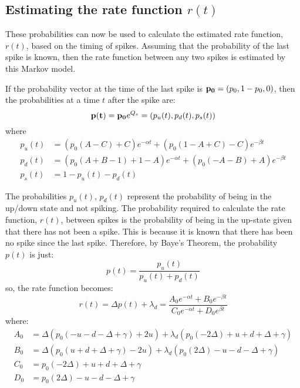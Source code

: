 \documentclass[11pt]{paper}
\begin{document}
\subsection{Estimating the rate function $r(t)$}

These probabilities can now be used to calculate the estimated rate function, $r(t)$, based on the timing of spikes.  Assuming that the probability of the last spike is known, then the rate function between any two spikes is estimated by this Markov model. 

If the probability vector at the time of the last spike is ${\bf p_0}=(p_0, 1-p_0,0)$, then the probabilities at a time $t$ after the spike are:
\begin{equation}
{\bf p(t)} = {\bf p_0}e^{Q_s} = (p_u(t),p_d(t),p_s(t))
\end{equation}
where
\begin{equation}
\begin{split}
p_u(t) &= (p_0(A-C)+C)e^{-\alpha t}+(p_0(1-A+C)-C)e^{-\beta t}\\
p_d(t) &= (p_0(A+B-1)+1-A)e^{-\alpha t}+(p_0(-A-B)+A)e^{-\beta t}\\
p_s(t) &= 1 - p_u(t) - p_d(t)
\end{split}
\end{equation}

The probabilities $p_u(t), \,p_d(t)$ represent the probability of being in the up/down state and not spiking.  The probability required to calculate the rate function, $r(t)$, between spikes is the probability of being in the up-state given that there has not been a spike.  This is because it is known that there has been no spike since the last spike.  Therefore, by Baye's Theorem, the probability $p(t)$ is just:
\begin{equation}
p(t)  = \frac{p_u(t)}{p_u(t) + p_d(t)}
\end{equation}
so, the rate function becomes:
\begin{equation}
r(t) = \Delta p(t) + \lambda_d = \frac{A_0e^{-\alpha t}+B_0e^{-\beta t}}{C_0e^{-\alpha t} + D_0e^{\beta t}}
\end{equation}
where:
\begin{equation}
\begin{split}
\label{abcd}
A_0 & = \Delta(p_0(-u-d-\Delta + \gamma)+2u)+\lambda_d(p_0(-2\Delta)+u+d+\Delta+\gamma)\\
B_0 & =\Delta(p_0(u+d+\Delta + \gamma)-2u)+\lambda_d(p_0(2\Delta)-u-d-\Delta+\gamma)\\
C_0 & = p_0(-2\Delta)+u+d+\Delta+\gamma\\
D_0 & = p_0(2\Delta) -u-d-\Delta + \gamma
\end{split}
\end{equation}
\end{document}
